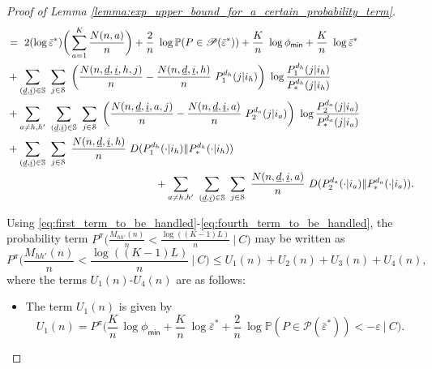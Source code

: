 \begin{proof}[Proof of Lemma \ref{lemma:exp_upper_bound_for_a_certain_probability_term}]
\begin{align}
	&=~ 2(\log \bar{\varepsilon}^*)\bigg(\sum\limits_{a=1}^{K}\frac{N(n, a)}{n}\bigg)+\frac{2}{n}~ \log \mathbb{P}(P\in \mathscr{P}(\bar{\varepsilon}^*)) + {\color{black} \frac{K}{n}~ \log\phi_{\textsf{min}}}+ \frac{K}{n}~ \log \bar{\varepsilon}^*\label{eq:first_term_to_be_handled}\\
	&+ \sum\limits_{(\underline{d}, \underline{i})\in \mathbb{S}}~\sum\limits_{j\in \mathcal{S}}~\bigg(\frac{N(n, \underline{d}, \underline{i}, h, j)}{n}-\frac{N(n, \underline{d}, \underline{i}, h)}{n}~P_1^{d_h}(j|i_h)\bigg)~\log \frac{P_1^{d_h}(j|i_h)}{P_*^{d_h}(j|i_h)}\label{eq:second_term_to_be_handled}\\
	&+ \sum\limits_{a\neq h, h'}~\sum\limits_{(\underline{d}, \underline{i})\in \mathbb{S}}~\sum\limits_{j\in \mathcal{S}}~\bigg(\frac{N(n, \underline{d}, \underline{i}, a, j)}{n}-\frac{N(n, \underline{d}, \underline{i}, a)}{n}~P_2^{d_a}(j|i_a)\bigg)~\log \frac{P_2^{d_a}(j|i_a)}{P_*^{d_a}(j|i_a)}\label{eq:third_term_to_be_handled}\\
	&+\sum\limits_{(\underline{d}, \underline{i})\in \mathbb{S}}~\sum\limits_{j\in \mathcal{S}}~\frac{N(n, \underline{d}, \underline{i}, h)}{n}~D(P_1^{d_h}(\cdot|i_h)\|P_*^{d_h}(\cdot|i_h))\nonumber\\
	&\hspace{5cm}+\sum\limits_{a\neq h, h'}~\sum\limits_{(\underline{d}, \underline{i})\in \mathbb{S}}~\sum\limits_{j\in \mathcal{S}}~\frac{N(n, \underline{d}, \underline{i}, a)}{n}~D(P_2^{d_a}(\cdot|i_a)\|P_*^{d_a}(\cdot|i_a))\label{eq:fourth_term_to_be_handled}.
\end{align}

Using \eqref{eq:first_term_to_be_handled}-\eqref{eq:fourth_term_to_be_handled}, the probability term $P^\pi\bigg(\frac{M_{hh'}(n)}{n}<\frac{\log((K-1)L)}{n}~\bigg|~C\bigg)$ may be written as
\begin{equation}
	P^\pi\bigg(\frac{M_{hh'}(n)}{n}<\frac{\log((K-1)L)}{n}~\bigg|~C\bigg)\leq U_1(n)+U_2(n)+U_3(n)+U_4(n),
	\label{eq:exp_bound_3}
\end{equation}
where the terms $U_1(n)$-$U_4(n)$ are as follows:
\begin{itemize}
	\item The term $U_1(n)$ is given by
	\begin{equation}
		U_1(n)=P^\pi\bigg(\frac{K}{n}\,\log\phi_{\textsf{min}} + \frac{K}{n}~ \log\bar{\varepsilon}^* + \frac{2}{n}~ \log \mathbb{P}(P\in \mathscr{P}(\bar{\varepsilon}^*))< -\varepsilon ~\bigg|~C\bigg).
		\label{eq:U_1(n)}
	\end{equation}
	

\end{itemize}
\end{proof}
